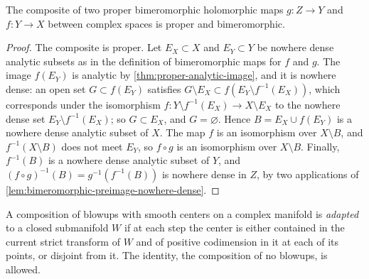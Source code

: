 \begin{corollary}\label{cor:bimeromorphic-composition}
The composite of two proper bimeromorphic holomorphic maps $g\colon Z\to Y$ and $f\colon Y\to X$ between complex spaces is proper and bimeromorphic.
\end{corollary}
\begin{proof}
The composite is proper. Let $E_X\subset X$ and $E_Y\subset Y$ be nowhere dense analytic subsets as in the definition of bimeromorphic maps for $f$ and $g$. The image $f(E_Y)$ is analytic by \cref{thm:proper-analytic-image}, and it is nowhere dense: an open set $G\subset f(E_Y)$ satisfies $G\setminus E_X\subset f(E_Y\setminus f^{-1}(E_X))$, which corresponds under the isomorphism $f\colon Y\setminus f^{-1}(E_X)\to X\setminus E_X$ to the nowhere dense set $E_Y\setminus f^{-1}(E_X)$; so $G\subset E_X$, and $G=\varnothing$. Hence $B=E_X\cup f(E_Y)$ is a nowhere dense analytic subset of $X$. The map $f$ is an isomorphism over $X\setminus B$, and $f^{-1}(X\setminus B)$ does not meet $E_Y$, so $f\circ g$ is an isomorphism over $X\setminus B$. Finally, $f^{-1}(B)$ is a nowhere dense analytic subset of $Y$, and $(f\circ g)^{-1}(B)=g^{-1}(f^{-1}(B))$ is nowhere dense in $Z$, by two applications of \cref{lem:bimeromorphic-preimage-nowhere-dense}.
\end{proof}

\begin{definition}\label{def:adapted-blowup-modification}
A composition of blowups with smooth centers on a complex manifold is \emph{adapted} to a closed submanifold $W$ if at each step the center is either contained in the current strict transform of $W$ and of positive codimension in it at each of its points, or disjoint from it. The identity, the composition of no blowups, is allowed.
\end{definition}

